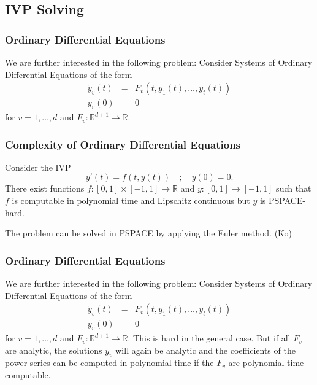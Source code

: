 \documentclass[xcolor=pdftex,dvipsnames,table]{beamer}
\newcommand{\RR}{\ensuremath{\mathbb{R}}}
\begin{document}
\subsection{IVP Solving}
\begin{frame}
  \frametitle{Ordinary Differential Equations}
  We are further interested in the following problem:\newline
Consider Systems of Ordinary Differential Equations of the form
\begin{eqnarray*}
  \dot y_v(t) &=& F_v(t, y_1(t), \dots, y_t(t)) \\
  y_v(0) &=& 0 
\end{eqnarray*}
for $v=1,\dots,d$ and $F_v : \RR^{d+1} \to \RR$.
  \end{frame}
\begin{frame}
\frametitle{Complexity of Ordinary Differential Equations}
\begin{theorem}[Kawamura, 2010]
Consider the IVP
$$
y'(t)=f(t,y(t)) \quad;\quad y(0)=0.
$$
\pause
There exist functions $f: [0,1] \times [-1,1] \to \RR$ and $y: [0,1] \to [-1,1]$
such that $f$ is computable in polynomial time and Lipschitz continuous
but $y$ is PSPACE-hard.
\end{theorem}
The problem can be solved in PSPACE by applying the Euler method. (Ko)
\end{frame}
\begin{frame}
  \frametitle{Ordinary Differential Equations}
  We are further interested in the following problem:\newline
Consider Systems of Ordinary Differential Equations of the form
\begin{eqnarray*}
  \dot y_v(t) &=& F_v(t, y_1(t), \dots, y_t(t)) \\
  y_v(0) &=& 0 
\end{eqnarray*}
for $v=1,\dots,d$ and $F_v : \RR^{d+1} \to \RR$.
\pause
This is hard in the general case.
\pause
But if all $F_v$ are analytic, the solutions $y_v$ will again be analytic and the coefficients of the power series
can be computed in polynomial time if the $F_v$ are polynomial time computable.
  \end{frame}
\end{document}
